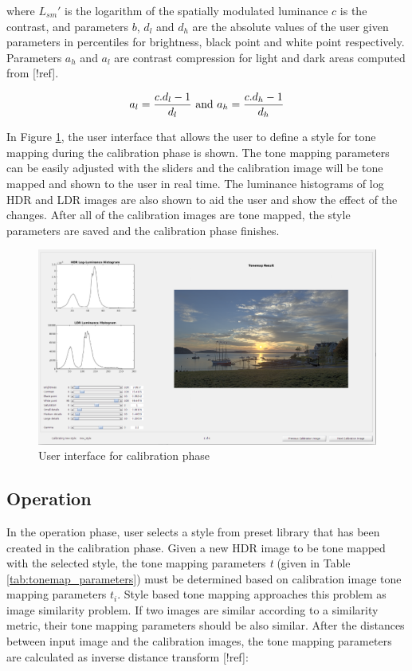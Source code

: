 where $L_{sm}'$ is the logarithm of the spatially modulated luminance $c$ is the contrast, and parameters $b$, $d_l$ and $d_h$ are the absolute values of the user given parameters in percentiles for brightness, black point and white point respectively. Parameters $a_h$ and $a_l$ are contrast compression for light and dark areas computed from [!ref].

\begin{equation}
    a_l = {{c . d_l-1} \over {d_l}} \text{ and } a_h = {{c . d_h-1} \over {d_h}}
\end{equation}

In Figure \ref{fig:calibration_phase}, the user interface that allows the user to define a style for tone mapping during the calibration phase is shown. The tone mapping parameters can be easily adjusted with the sliders and the calibration image will be tone mapped and shown to the user in real time. The luminance histograms of log HDR and LDR images are also shown to aid the user and show the effect of the changes. After all of the calibration images are tone mapped, the style parameters are saved and the calibration phase finishes.

\begin{figure}
\begin{center}
\includegraphics[width=\textwidth]{figures/chapter5/ui_screenshot.png}
\caption{User interface for calibration phase}
\label{fig:calibration_phase}
\end{center}
\end{figure}

\subsection{Operation}
\label{sec:operation}
In the operation phase, user selects a style from preset library that has been created in the calibration phase. Given a new HDR image to be tone mapped with the selected style, the tone mapping parameters \emph{t} (given in Table \ref{tab:tonemap_parameters}) must be determined based on calibration image tone mapping parameters \emph{$t_i$}. Style based tone mapping approaches this problem as image similarity problem. If two images are similar according to a similarity metric, their tone mapping parameters should be also similar. After the distances between input image and the calibration images, the tone mapping parameters are calculated as inverse distance transform [!ref]:

